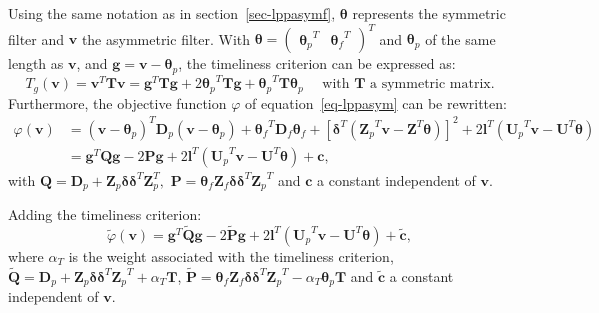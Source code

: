 \documentclass[
]{article}
\newcommand\transp[1]{{#1}^T}
\newcommand\1{\mathds{1}}
\begin{document}
Using the same notation as in section~\ref{sec-lppasymf},
\(\boldsymbol\theta\) represents the symmetric filter and
\(\boldsymbol v\) the asymmetric filter. With
\(\boldsymbol\theta=\transp{\begin{pmatrix}\transp{\boldsymbol\theta_p}&\transp{\boldsymbol\theta_f}\end{pmatrix}}\)
and \(\boldsymbol\theta_p\) of the same length as \(\boldsymbol v\), and
\(\boldsymbol g=\boldsymbol v-\boldsymbol \theta_p\), the timeliness
criterion can be expressed as: \[
T_g(\boldsymbol v)=\transp{\boldsymbol v}\boldsymbol T\boldsymbol v=\transp{\boldsymbol g}\boldsymbol T\boldsymbol g+2\transp{\boldsymbol \theta_p}\boldsymbol T\boldsymbol g+\transp{\boldsymbol \theta_p}\boldsymbol T\boldsymbol \theta_p
\quad\text{ with }\boldsymbol T\text{ a symmetric matrix}.
\] Furthermore, the objective function \(\varphi\) of
equation~\ref{eq-lppasym} can be rewritten: \begin{align*}
\varphi(\boldsymbol v)&=\transp{(\boldsymbol v-\boldsymbol \theta_p)}\boldsymbol D_{p}(\boldsymbol v-\boldsymbol \theta_p)+
  \transp{\boldsymbol \theta_f}\boldsymbol D_{f}\boldsymbol \theta_f+
  [\transp{\boldsymbol \delta}(\transp{\boldsymbol Z_{p}}\boldsymbol v-\transp{\boldsymbol Z}\boldsymbol \theta)]^{2}+
2\transp{\boldsymbol l}(\transp{\boldsymbol U_{p}}\boldsymbol v-\transp{\boldsymbol U}\boldsymbol \theta)\\
&=\transp{\boldsymbol g}\boldsymbol Q\boldsymbol g-2\boldsymbol P\boldsymbol g+2\transp{\boldsymbol l}(\transp{\boldsymbol U_{p}}\boldsymbol v-\transp{\boldsymbol U}\boldsymbol \theta)+\boldsymbol c,
\end{align*} with
\(\boldsymbol Q=\boldsymbol D_p+\boldsymbol Z_p\boldsymbol \delta\transp{\boldsymbol \delta}\transp{\boldsymbol Z}_p,\)
\(\boldsymbol P=\boldsymbol \theta_f\boldsymbol Z_f\boldsymbol \delta\transp{\boldsymbol \delta}\transp{\boldsymbol Z_p}\)
and \(\boldsymbol c\) a constant independent of \(\boldsymbol v.\)

Adding the timeliness criterion: \[
\widetilde\varphi(\boldsymbol v)=\transp{\boldsymbol g}\widetilde {\boldsymbol Q}\boldsymbol g-
2\widetilde {\boldsymbol P}\boldsymbol g+2\transp{\boldsymbol l}(\transp{\boldsymbol U_{p}}\boldsymbol v-\transp{\boldsymbol U}\boldsymbol \theta)+
\widetilde {\boldsymbol c},
\] where \(\alpha_T\) is the weight associated with the timeliness
criterion,
\(\widetilde {\boldsymbol Q}=\boldsymbol D_p+\boldsymbol Z_p\boldsymbol \delta\transp{\boldsymbol \delta}\transp{\boldsymbol Z_p} + \alpha_T\boldsymbol T\),
\(\widetilde {\boldsymbol P}=\boldsymbol \theta_f\boldsymbol Z_f\boldsymbol \delta\transp{\boldsymbol \delta}\transp{\boldsymbol Z_p}-\alpha_T\boldsymbol \theta_p\boldsymbol T\)
and \(\widetilde {\boldsymbol c}\) a constant independent of
\(\boldsymbol v.\)
\end{document}
